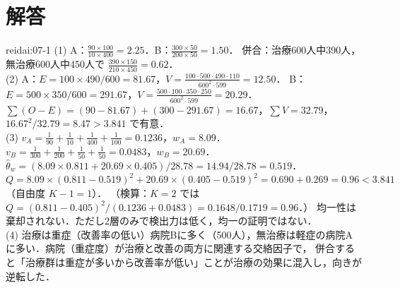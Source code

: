 \section{解答}\label{sec:07-sol}
\begin{kaitou}{reidai:07-1}
(1) A：$\frac{90\times100}{10\times400}=2.25$．B：$\frac{300\times50}{200\times50}=1.50$．
併合：治療600人中390人，無治療600人中450人で $\frac{390\times150}{210\times450}=0.62$．\\
(2) A：$E=100\times490/600=81.67$，$V=\frac{100\cdot500\cdot490\cdot110}{600^2\cdot599}=12.50$．
B：$E=500\times350/600=291.67$，$V=\frac{500\cdot100\cdot350\cdot250}{600^2\cdot599}=20.29$．
$\sum(O-E)=(90-81.67)+(300-291.67)=16.67$，$\sum V=32.79$，$16.67^2/32.79=8.47>3.841$ で有意．\\
(3) $v_A=\frac1{90}+\frac1{10}+\frac1{400}+\frac1{100}=0.1236$，$w_A=8.09$．
$v_B=\frac1{300}+\frac1{200}+\frac1{50}+\frac1{50}=0.0483$，$w_B=20.69$．
$\hat\theta_w=(8.09\times0.811+20.69\times0.405)/28.78=14.94/28.78=0.519$．
$Q=8.09\times(0.811-0.519)^2+20.69\times(0.405-0.519)^2=0.690+0.269=0.96<3.841$（自由度 $K-1=1$）．
（検算：$K=2$ では $Q=(0.811-0.405)^2/(0.1236+0.0483)=0.1648/0.1719=0.96$．）
均一性は棄却されない．ただし2層のみで検出力は低く，均一の証明ではない．\\
(4) 治療は重症（改善率の低い）病院Bに多く（500人），無治療は軽症の病院Aに多い．病院（重症度）が治療と改善の両方に関連する交絡因子で，
併合すると「治療群は重症が多いから改善率が低い」ことが治療の効果に混入し，向きが逆転した．
\end{kaitou}

